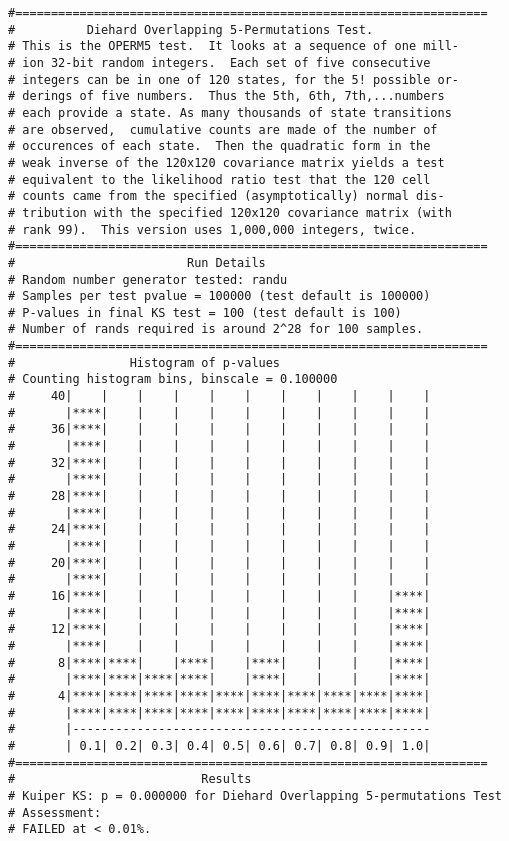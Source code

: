 \documentclass[12pt]{article}
\begin{document}
{\begin{verbatim}
#==================================================================
#          Diehard Overlapping 5-Permutations Test.
# This is the OPERM5 test.  It looks at a sequence of one mill- 
# ion 32-bit random integers.  Each set of five consecutive     
# integers can be in one of 120 states, for the 5! possible or- 
# derings of five numbers.  Thus the 5th, 6th, 7th,...numbers   
# each provide a state. As many thousands of state transitions  
# are observed,  cumulative counts are made of the number of    
# occurences of each state.  Then the quadratic form in the     
# weak inverse of the 120x120 covariance matrix yields a test   
# equivalent to the likelihood ratio test that the 120 cell     
# counts came from the specified (asymptotically) normal dis-   
# tribution with the specified 120x120 covariance matrix (with  
# rank 99).  This version uses 1,000,000 integers, twice.       
#==================================================================
#                        Run Details
# Random number generator tested: randu
# Samples per test pvalue = 100000 (test default is 100000)
# P-values in final KS test = 100 (test default is 100)
# Number of rands required is around 2^28 for 100 samples.
#==================================================================
#                Histogram of p-values
# Counting histogram bins, binscale = 0.100000
#     40|    |    |    |    |    |    |    |    |    |    |
#       |****|    |    |    |    |    |    |    |    |    |
#     36|****|    |    |    |    |    |    |    |    |    |
#       |****|    |    |    |    |    |    |    |    |    |
#     32|****|    |    |    |    |    |    |    |    |    |
#       |****|    |    |    |    |    |    |    |    |    |
#     28|****|    |    |    |    |    |    |    |    |    |
#       |****|    |    |    |    |    |    |    |    |    |
#     24|****|    |    |    |    |    |    |    |    |    |
#       |****|    |    |    |    |    |    |    |    |    |
#     20|****|    |    |    |    |    |    |    |    |    |
#       |****|    |    |    |    |    |    |    |    |    |
#     16|****|    |    |    |    |    |    |    |    |****|
#       |****|    |    |    |    |    |    |    |    |****|
#     12|****|    |    |    |    |    |    |    |    |****|
#       |****|    |    |    |    |    |    |    |    |****|
#      8|****|****|    |****|    |****|    |    |    |****|
#       |****|****|****|****|    |****|    |    |    |****|
#      4|****|****|****|****|****|****|****|****|****|****|
#       |****|****|****|****|****|****|****|****|****|****|
#       |--------------------------------------------------
#       | 0.1| 0.2| 0.3| 0.4| 0.5| 0.6| 0.7| 0.8| 0.9| 1.0|
#==================================================================
#                          Results
# Kuiper KS: p = 0.000000 for Diehard Overlapping 5-permutations Test
# Assessment:
# FAILED at < 0.01%.


\end{verbatim}}
\end{document}
